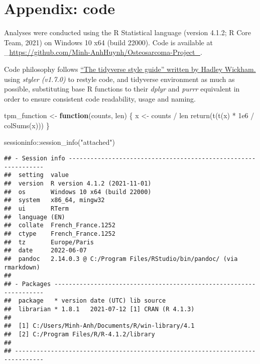 \documentclass[
]{article}
\author{}
\date{\vspace{-2.5em}}
\newenvironment{Shaded}{\begin{snugshade}}{\end{snugshade}}
\newcommand{\ControlFlowTok}[1]{\textcolor[rgb]{0.13,0.29,0.53}{\textbf{#1}}}
\newcommand{\FloatTok}[1]{\textcolor[rgb]{0.00,0.00,0.81}{#1}}
\newcommand{\FunctionTok}[1]{\textcolor[rgb]{0.00,0.00,0.00}{#1}}
\newcommand{\NormalTok}[1]{#1}
\newcommand{\OtherTok}[1]{\textcolor[rgb]{0.56,0.35,0.01}{#1}}
\newcommand{\SpecialCharTok}[1]{\textcolor[rgb]{0.00,0.00,0.00}{#1}}
\newcommand{\StringTok}[1]{\textcolor[rgb]{0.31,0.60,0.02}{#1}}
\begin{document}
\hypertarget{appendix-code}{%
\section{Appendix: code}\label{appendix-code}}

Analyses were conducted using the R Statistical language (version 4.1.2;
R Core Team, 2021) on Windows 10 x64 (build 22000). Code is available at
\_\url{https://github.com/Minh-AnhHuynh/Osteosarcoma-Project_}.

Code philosophy follows \href{https://style.tidyverse.org/}{``The
tidyverse style guide'' written by Hadley Wickham.} using \emph{styler
(v1.7.0)} to restyle code, and tidyverse environment as much as
possible, substituting base R functions to their \emph{dplyr} and
\emph{purrr} equivalent in order to ensure consistent code readability,
usage and naming.


\begin{Shaded}
\begin{Highlighting}[]
\NormalTok{tpm\_function }\OtherTok{\textless{}{-}} \ControlFlowTok{function}\NormalTok{(counts, len) \{}
\NormalTok{  x }\OtherTok{\textless{}{-}}\NormalTok{ counts }\SpecialCharTok{/}\NormalTok{ len}
  \FunctionTok{return}\NormalTok{(}\FunctionTok{t}\NormalTok{(}\FunctionTok{t}\NormalTok{(x) }\SpecialCharTok{*} \FloatTok{1e6} \SpecialCharTok{/} \FunctionTok{colSums}\NormalTok{(x)))}
\NormalTok{\}}
\end{Highlighting}
\end{Shaded}

\begin{Shaded}
\begin{Highlighting}[]
\NormalTok{sessioninfo}\SpecialCharTok{::}\FunctionTok{session\_info}\NormalTok{(}\StringTok{"attached"}\NormalTok{)}
\end{Highlighting}
\end{Shaded}

\begin{verbatim}
## - Session info ---------------------------------------------------------------
##  setting  value
##  version  R version 4.1.2 (2021-11-01)
##  os       Windows 10 x64 (build 22000)
##  system   x86_64, mingw32
##  ui       RTerm
##  language (EN)
##  collate  French_France.1252
##  ctype    French_France.1252
##  tz       Europe/Paris
##  date     2022-06-07
##  pandoc   2.14.0.3 @ C:/Program Files/RStudio/bin/pandoc/ (via rmarkdown)
## 
## - Packages -------------------------------------------------------------------
##  package   * version date (UTC) lib source
##  librarian * 1.8.1   2021-07-12 [1] CRAN (R 4.1.3)
## 
##  [1] C:/Users/Minh-Anh/Documents/R/win-library/4.1
##  [2] C:/Program Files/R/R-4.1.2/library
## 
## ------------------------------------------------------------------------------
\end{verbatim}
\end{document}
